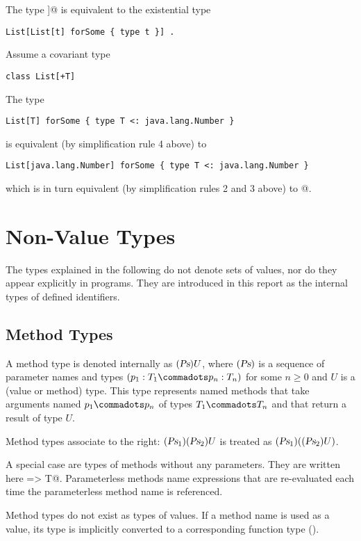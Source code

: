 \example The type \lstinline@List[List[_]]@ is equivalent to the existential type
\begin{lstlisting}
List[List[t] forSome { type t }] . 
\end{lstlisting}

\example Assume a covariant type
\begin{lstlisting}
class List[+T]
\end{lstlisting}
The type
\begin{lstlisting}
List[T] forSome { type T <: java.lang.Number }
\end{lstlisting}
is equivalent (by simplification rule 4 above) to
\begin{lstlisting}
List[java.lang.Number] forSome { type T <: java.lang.Number }
\end{lstlisting}
which is in turn equivalent (by simplification rules 2 and 3 above) to
@.

\section{Non-Value Types}
\label{sec:synthetic-types}

The types explained in the following do not denote sets of values, nor
do they appear explicitly in programs. They are introduced in this
report as the internal types of defined identifiers.

\subsection{Method Types}
\label{sec:method-types}

A method type is denoted internally as $(\mbox{\sl Ps})U$, where $(\mbox{\sl Ps})$ is a
sequence of parameter names and types $(p_1:T_1 \commadots p_n:T_n)$
for some $n \geq 0$ and $U$ is a (value or method) type.  This type
represents named methods that take arguments named $p_1 \commadots p_n$ 
of types $T_1 \commadots T_n$
and that return a result of type $U$.

Method types associate to the right: $(\mbox{\sl Ps}_1)(\mbox{\sl Ps}_2)U$ is
treated as $(\mbox{\sl Ps}_1)((\mbox{\sl Ps}_2)U)$.

A special case are types of methods without any parameters. They are
written here \lstinline@=> T@. Parameterless methods name expressions
that are re-evaluated each time the parameterless method name is
referenced.

Method types do not exist as types of values. If a method name is used
as a value, its type is implicitly converted to a corresponding
function type ().

